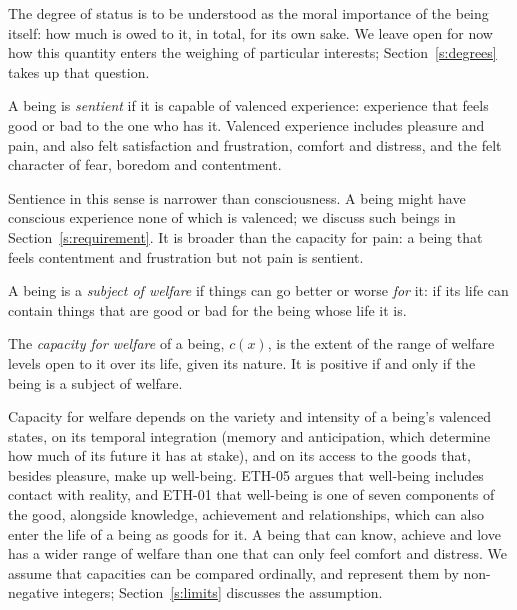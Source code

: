 \documentclass{situationist-preprint}
\begin{document}
The degree of status is to be understood as the moral importance of the being itself: how much is owed to it, in total, for its own sake. We leave open for now how this quantity enters the weighing of particular interests; Section~\ref{s:degrees} takes up that question.

\begin{definition}[Sentience]\label{d:sentience}
A being is \emph{sentient} if it is capable of valenced experience: experience that feels good or bad to the one who has it. Valenced experience includes pleasure and pain, and also felt satisfaction and frustration, comfort and distress, and the felt character of fear, boredom and contentment.
\end{definition}

Sentience in this sense is narrower than consciousness. A being might have conscious experience none of which is valenced; we discuss such beings in Section~\ref{s:requirement}. It is broader than the capacity for pain: a being that feels contentment and frustration but not pain is sentient.

\begin{definition}\label{d:welfare}
A being is a \emph{subject of welfare} if things can go better or worse \emph{for} it: if its life can contain things that are good or bad for the being whose life it is.
\end{definition}

\begin{definition}\label{d:capacity}
The \emph{capacity for welfare} of a being, $c(x)$, is the extent of the range of welfare levels open to it over its life, given its nature. It is positive if and only if the being is a subject of welfare.
\end{definition}

Capacity for welfare depends on the variety and intensity of a being's valenced states, on its temporal integration (memory and anticipation, which determine how much of its future it has at stake), and on its access to the goods that, besides pleasure, make up well-being. ETH-05 argues that well-being includes contact with reality, and ETH-01 that well-being is one of seven components of the good, alongside knowledge, achievement and relationships, which can also enter the life of a being as goods for it. A being that can know, achieve and love has a wider range of welfare than one that can only feel comfort and distress. We assume that capacities can be compared ordinally, and represent them by non-negative integers; Section~\ref{s:limits} discusses the assumption.
\end{document}

